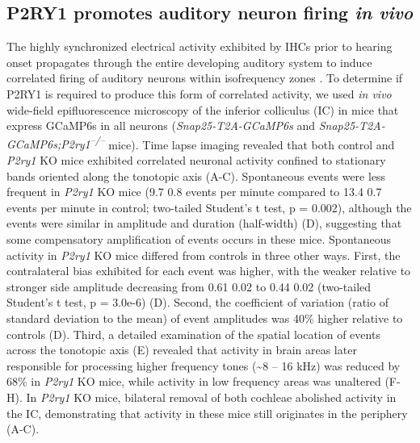 \documentclass[9pt,lineno]{elife}
\begin{document}
\subsection{P2RY1 promotes auditory neuron firing \textit{in vivo}}
The highly synchronized electrical activity exhibited by IHCs prior to hearing onset propagates through the entire developing auditory system to induce correlated firing of auditory neurons within isofrequency zones \citep{Babola2018,Tritsch2010a}. To determine if P2RY1 is required to produce this form of correlated activity, we used \textit{in vivo} wide-field epifluorescence microscopy of the inferior colliculus (IC) in mice that express GCaMP6s in all neurons (\textit{Snap25-T2A-GCaMP6s} and \textit{Snap25-T2A-GCaMP6s;P2ry1\textsuperscript{–/–}} mice). Time lapse imaging revealed that both control and \textit{P2ry1} KO mice exhibited correlated neuronal activity confined to stationary bands oriented along the tonotopic axis (A-C). Spontaneous events were less frequent in \textit{P2ry1} KO mice (9.7 \textpm \hspace{0.2 mm} 0.8 events per minute compared to 13.4 \textpm \hspace{0.2 mm} 0.7 events per minute in control; two-tailed Student’s t test, p = 0.002), although the events were similar in amplitude and duration (half-width) (D), suggesting that some compensatory amplification of events occurs in these mice. Spontaneous activity in \textit{P2ry1} KO mice differed from controls in three other ways. First, the contralateral bias exhibited for each event was higher, with the weaker relative to stronger side amplitude decreasing from 0.61 \textpm \hspace{0.2 mm} 0.02 to 0.44 \textpm \hspace{0.2 mm} 0.02  (two-tailed Student’s t test, p = 3.0e-6) (D). Second, the coefficient of variation (ratio of standard deviation to the mean) of event amplitudes was 40\% higher relative to controls (D). Third, a detailed examination of the spatial location of events across the tonotopic axis (E) revealed that activity in brain areas later responsible for processing higher frequency tones (\textasciitilde 8 -- 16 kHz) was reduced by 68\% in \textit{P2ry1} KO mice, while activity in low frequency areas was unaltered (F-H). In \textit{P2ry1} KO mice, bilateral removal of both cochleae abolished activity in the IC, demonstrating that activity in these mice still originates in the periphery (A-C).
\end{document}
